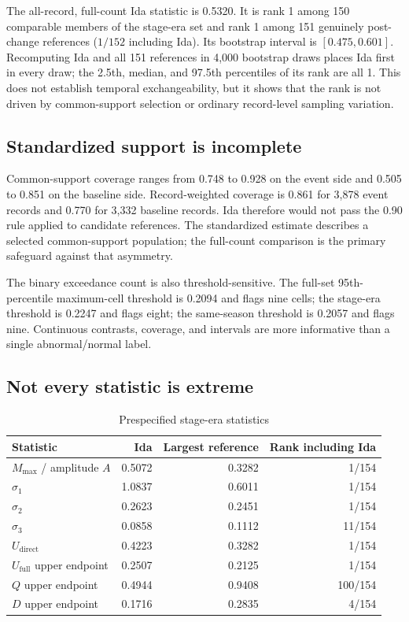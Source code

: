 \documentclass[11pt]{article}
\begin{document}
The all-record, full-count Ida statistic is 0.5320. It is rank 1 among 150 comparable members of the stage-era set and rank 1 among 151 genuinely post-change references ($1/152$ including Ida). Its bootstrap interval is $[0.475,0.601]$. Recomputing Ida and all 151 references in 4,000 bootstrap draws places Ida first in every draw; the 2.5th, median, and 97.5th percentiles of its rank are all 1. This does not establish temporal exchangeability, but it shows that the rank is not driven by common-support selection or ordinary record-level sampling variation.

\subsection{Standardized support is incomplete}

Common-support coverage ranges from 0.748 to 0.928 on the event side and 0.505 to 0.851 on the baseline side. Record-weighted coverage is 0.861 for 3,878 event records and 0.770 for 3,332 baseline records. Ida therefore would not pass the 0.90 rule applied to candidate references. The standardized estimate describes a selected common-support population; the full-count comparison is the primary safeguard against that asymmetry.

The binary exceedance count is also threshold-sensitive. The full-set 95th-percentile maximum-cell threshold is 0.2094 and flags nine cells; the stage-era threshold is 0.2247 and flags eight; the same-season threshold is 0.2057 and flags nine. Continuous contrasts, coverage, and intervals are more informative than a single abnormal/normal label.

\subsection{Not every statistic is extreme}

\begin{table}[t]
\centering
\caption{Prespecified stage-era statistics}
\label{tab:secondary}
\begin{tabular}{@{}lrrr@{}}
\toprule
Statistic & Ida & Largest reference & Rank including Ida \\
\midrule
$M_{\max}$ / amplitude $A$ & 0.5072 & 0.3282 & 1/154 \\
$\sigma_1$ & 1.0837 & 0.6011 & 1/154 \\
$\sigma_2$ & 0.2623 & 0.2451 & 1/154 \\
$\sigma_3$ & 0.0858 & 0.1112 & 11/154 \\
$U_{\mathrm{direct}}$ & 0.4223 & 0.3282 & 1/154 \\
$U_{\mathrm{full}}$ upper endpoint & 0.2507 & 0.2125 & 1/154 \\
$Q$ upper endpoint & 0.4944 & 0.9408 & 100/154 \\
$D$ upper endpoint & 0.1716 & 0.2835 & 4/154 \\
\bottomrule
\end{tabular}
\end{table}
\end{document}

